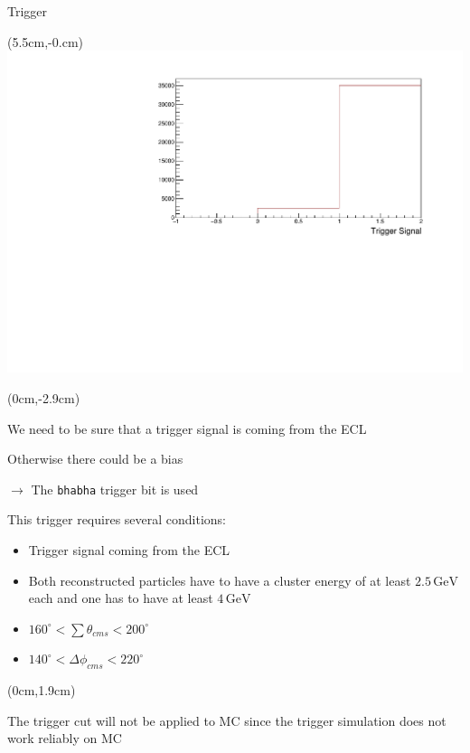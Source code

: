 \documentclass[8pt]{beamer}
\begin{document}
\begin{frame}{Trigger}
	
	\begin{textblock*}{6.5cm}(5.5cm,-0.cm)
		\includegraphics[width=\textwidth]{VBilder/DataTrigger}
	\end{textblock*}
	
	
	
	
	
	\begin{textblock*}{11cm}(0cm,-2.9cm)
		
		We need to be sure that a trigger signal is coming from the ECL 
		
		Otherwise there could be a bias
		
		$\rightarrow$ The \texttt{bhabha} trigger bit is used
		
		This trigger requires several conditions:
		\begin{itemize}
			\item Trigger signal coming from the ECL
			\item Both reconstructed particles have to have a cluster energy of at least $2.5\,\textrm{GeV}$ each and one has to have at least $4\,\textrm{GeV}$
			\item $160^{\circ} < \sum \theta_{cms} < 200^{\circ}$
			\item $140^{\circ} < \Delta \phi_{cms} < 220^{\circ}$
		
		\end{itemize}
	
\end{textblock*}
	
	
	
	
	\begin{textblock*}{5.5cm}(0cm,1.9cm)
	
	The trigger cut will not be applied to MC since the trigger simulation does not work reliably on MC 
	\end{textblock*}
\end{frame}
\end{document}
